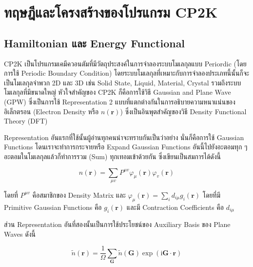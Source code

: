 

\chapter{ทฤษฎีและโครงสร้างของโปรแกรม CP2K}
\label{ap:cp2k}

\section{Hamiltonian และ Energy Functional}

CP2K เป็นโปรแกรมเคมีควอนตัมที่มีวัตถุประสงค์ในการจำลองระบบโมเลกุลแบบ Periordic (โดยการใช้ Periodic Boundary Condition) 
โดยระบบโมเลกุลที่เหมาะกับการจำลองประเภทนี้นั้นก็จะเป็นโมเลกุลจำพวก 2D และ 3D เช่น Solid State, Liquid, Material, Crystal 
รวมถึงระบบโมเลกุลที่มีขนาดใหญ่ หัวใจสำคัญของ CP2K ก็คือการใช้วิธี Gaussian and Plane Wave (GPW) ซึ่งเป็นการใช้ Representation 2 
แบบที่แตกต่างกันในการอธิบายความหนาแน่นของอิเล็กตรอน (Electron Density หรือ $n(\boldsymbol{r})$) ซึ่งเป็นอินพุตสำคัญของวิธี 
Density Functional Theory (DFT) 

Representation อันแรกที่ใช้นั้นผู้อ่านทุกคนน่าจะทราบกันเป็นว่าอย่าง นั่นก็คือการใช้ Gaussian Functions โดนเราจะทำการกระจายหรือ Expand 
Gaussian Functions อันนี้ไปยังอะตอมทุก ๆ อะตอมในโมเลกุลแล้วก็ทำการรวม (Sum) ทุกเทอมเข้าด้วยกัน ซึ่งเขียนเป็นสมการได้ดังนี้ 

\begin{equation}
    n(\boldsymbol{r})
    =
    \sum_{\mu v} P^{\mu v} \varphi_\mu(\boldsymbol{r}) \varphi_v(\boldsymbol{r})
\end{equation}

\noindent โดยที่ $P^{\mu v}$ คือสมาชิกของ Density Matrix และ $\varphi_\mu(\boldsymbol{r}) = \sum_i d_{i \mu} 
g_i(\boldsymbol{r})$ โดยที่มี Primitive Gaussian Functions คือ $g_i(\boldsymbol{r})$ และมี Contraction Coefficients 
คือ $d_{i \mu}$ 

ส่วน Representation อันที่สองนั้นเป็นการใช้ประโยชน์ของ Auxiliary Basis ของ Plane Waves ดังนี้

\begin{equation}
    \tilde{n}(\boldsymbol{r})
    =
    \frac{1}{\Omega} \sum_{\boldsymbol{G}} \tilde{n}(\boldsymbol{G}) 
    \exp (\mathrm{i} \boldsymbol{G} \cdot \boldsymbol{r})
\end{equation}

